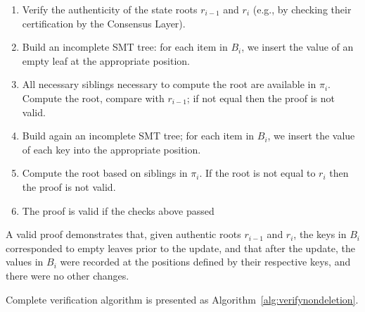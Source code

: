\documentclass[twocolumn]{article}
\begin{document}
\begin{enumerate}
    \item Verify the authenticity of the state roots $r_{i-1}$ and $r_i$ (e.g., by checking their certification by the Consensus Layer).
    \item Build an incomplete SMT tree: for each item in $B_i$, we insert the value of an empty leaf at the appropriate position.
    \item All necessary siblings necessary to compute the root are available in $\pi_i$. Compute the root, compare with $r_{i-1}$; if not equal then the proof is not valid.
    \item Build again an incomplete SMT tree; for each item in $B_i$, we insert the value of each key into the appropriate position.
    \item Compute the root based on siblings in $\pi_i$. If the root is not equal to $r_i$ then the proof is not valid.
    \item The proof is valid if the checks above passed
\end{enumerate}

A valid proof demonstrates that, given authentic roots $r_{i-1}$ and $r_i$, the keys in $B_i$ corresponded to empty leaves prior to the update, and that after the update, the values in $B_i$ were recorded at the positions defined by their respective keys, and there were no other changes.

Complete verification algorithm is presented as Algorithm~\ref{alg:verifynondeletion}.
\end{document}
